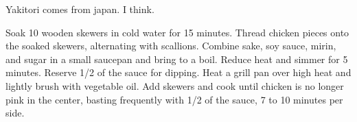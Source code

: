 \begin{recipe}

\begin{recipemeta}
Yakitori comes from japan. I think.
\end{recipemeta}

\begin{recipetext}
Soak 10 wooden skewers in cold water for 15 minutes.
Thread chicken pieces onto the soaked skewers, alternating with scallions.
Combine sake, soy sauce, mirin, and sugar in a small saucepan and bring to a boil. Reduce heat and simmer for 5 minutes. Reserve 1/2 of the sauce for dipping.
Heat a grill pan over high heat and lightly brush with vegetable oil. Add skewers and cook until chicken is no longer pink in the center, basting frequently with 1/2 of the sauce, 7 to 10 minutes per side.
\end{recipetext}
\end{recipe}
